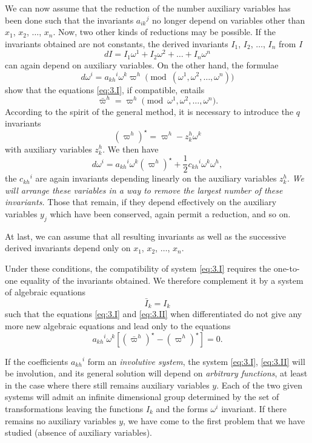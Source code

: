 \documentclass[leqno,11pt]{article}
\theoremstyle{shape1}
\theoremstyle{shape0}
\theoremstyle{shape2}
\theoremstyle{definition}
\newcommand{\vp}{\varpi}
\begin{document}
We can now assume that the reduction of the number auxiliary variables has been done such that the invariants $a_{ik}{}^{j}$ no longer depend on variables other than $x_{1}$, $x_{2}$, $\dots$, $x_{n}$. Now, two other kinds of reductions may be possible. If the invariants obtained are not constants, the derived invariants $I_{1}$, $I_{2}$, $\dots$, $I_{n}$ from $I$
\[
dI=I_{1}\omega^{1}+I_{2}\omega^{2}+\dots+I_{n}\omega^{n}
\]
can again depend on auxiliary variables. On the other hand, the formulae
\[
d\omega^{i}=a_{kh}{}^{i}\omega^{k}\vp^{h}\pmod(\omega^{1},\omega^{2},\dots,\omega^{n})
\]
show that the equations \eqref{eq:3.I}, if compatible, entails
\[
\bar\vp^{h}=\vp^{h}\pmod{\omega^{1},\omega^{2},\dots,\omega^{n}}.
\]
According to the spirit of the general method, it is necessary to introduce the $q$ invariants 
\[
(\vp^{h})^{\star}=\vp^{h}-z^{h}_{k}\omega^{k}
\]
with auxiliary variables $z_{k}^{h}$. We then have
\[
d\omega^{i}=a_{kh}{}^{i}\omega^{k}(\vp^{h})^{\star}+\frac{1}{2}c_{kh}{}^{i}\omega^{k}\omega^{h},
\]
the $c_{kh}{}^{i}$ are again invariants depending linearly on the auxiliary variables $z_{k}^{h}$. \emph{We will arrange these variables in a way to remove the largest number of these invariants.} Those that remain, if they depend effectively on the auxiliary variables $y_{j}$ which have been conserved, again permit a reduction, and so on.

At last, we can assume that all resulting invariants as well as the successive derived invariants depend only on $x_{1}$, $x_{2}$, $\dots$, $x_{n}$.

Under these conditions, the compatibility of system \eqref{eq:3.I} requires the one-to-one equality of the invariants obtained. We therefore complement it by a system of algebraic equations
\begin{equation}
  \label{eq:3.II}\tag{II}
  \bar I_{k}=I_{k}
\end{equation}
such that the equations \eqref{eq:3.I} and \eqref{eq:3.II} when differentiated do not give any more new algebraic equations and lead only to the equations
\[
a_{kh}{}^{i}\omega^{k}[(\bar\vp^{h})^{\star}-(\vp^{h})^{\star}]=0.
\]

If the coefficients $a_{kh}{}^{i}$ form an \emph{involutive system}, the system \eqref{eq:3.I}, \eqref{eq:3.II} will be involution, and its general solution will depend on \emph{arbitrary functions}, at least in the case where there still remains auxiliary variables $y$. Each of the two given systems will admit an infinite dimensional group determined by the set of transformations leaving the functions $I_{k}$ and the forms $\omega^{i}$ invariant. If there remains no auxiliary variables $y$, we have come to the first problem that we have studied (absence of auxiliary variables).
\end{document}
